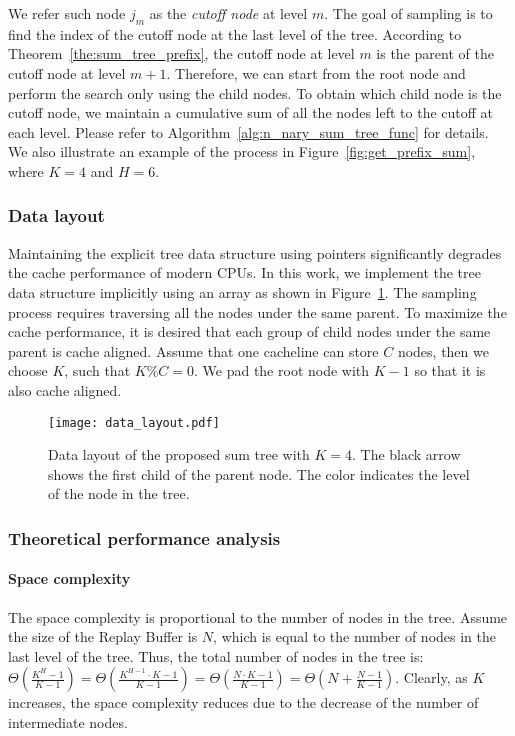 We refer such node $j_m$ as the \textit{cutoff node} at level $m$. The goal of sampling is to find the index of the cutoff node at the last level of the tree. 
According to Theorem~\ref{the:sum_tree_prefix}, the cutoff node at level $m$ is the parent of the cutoff node at level $m+1$. 
Therefore, we can start from the root node and perform the search only using the child nodes. To obtain which child node is the cutoff node, we maintain a cumulative sum of all the nodes left to the cutoff at each level. Please refer to Algorithm~\ref{alg:n_nary_sum_tree_func} for details.
We also illustrate an example of the process in Figure~\ref{fig:get_prefix_sum}, where $K=4$ and $H=6$.

\subsubsection{Data layout}
Maintaining the explicit tree data structure using pointers significantly degrades the cache performance of modern CPUs. In this work, we implement the tree data structure implicitly using an array as shown in Figure~\ref{fig:data_layout}. The sampling process requires traversing all the nodes under the same parent. To maximize the cache performance, it is desired that each group of child nodes under the same parent is cache aligned. Assume that one cacheline can store $C$ nodes, then we choose $K$, such that $K\%C=0$. We pad the root node with $K-1$ so that it is also cache aligned.

\begin{figure}
    \centering
    \texttt{[image: data\_layout.pdf]}
    \caption{Data layout of the proposed sum tree with $K=4$. The black arrow shows the first child of the parent node. The color indicates the level of the node in the tree.}
    \label{fig:data_layout}
\end{figure}

\subsubsection{Theoretical performance analysis}
\paragraph{Space complexity}
The space complexity is proportional to the number of nodes in the tree. Assume the size of the Replay Buffer is $N$, which is equal to the number of nodes in the last level of the tree. Thus, the total number of nodes in the tree is: $\Theta(\frac{K^H-1}{K-1})=\Theta(\frac{K^{H-1}\cdot K-1}{K-1})=\Theta(\frac{N\cdot K-1}{K-1})=\Theta(N+\frac{N-1}{K-1})$. Clearly, as $K$ increases, the space complexity reduces due to the decrease of the number of intermediate nodes.

